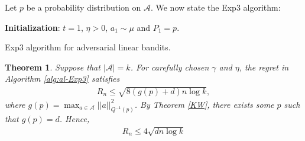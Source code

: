 \documentclass[10pt,a4article]{amsart}
\numberwithin{equation}{section}
\theoremstyle{plain}
\newtheorem{Th}{Theorem}
\theoremstyle{definition}
\begin{document}
Let $p$ be a probability distribution on $\mathcal A$. We now state the Exp3 algorithm:
\begin{algorithm}
\DontPrintSemicolon
 \textbf{Initialization}: $t=1$, $\eta>0$, $a_1\sim\mu$ and $P_1=p$.\\
\caption{Exp3 algorithm for adversarial linear bandits.} 
\label{alg:al-Exp3}
\end{algorithm}
\begin{Th}
Suppose that $|\mathcal A|=k$. For carefully chosen $\gamma$ and $\eta$, the regret in Algorithm \ref{alg:al-Exp3} satisfies
\begin{align*}
R_n\leq\sqrt{8(g(p)+d)n\log k},
\end{align*}
where $g(p)=\max_{a\in\mathcal A}||a||^2_{Q^{-1}(p)}$. By Theorem \ref{KW}, there exists some $p$ such that $g(p)=d$. Hence,
\begin{align*}
R_n\leq 4\sqrt{dn\log k}
\end{align*}
\end{Th}
\end{document}
